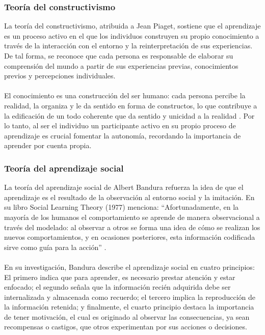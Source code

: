 \subsubsection{Teoría del constructivismo}
La teoría del constructivismo, atribuida a Jean Piaget, sostiene que el aprendizaje es un proceso activo en el que los individuos construyen su propio conocimiento a través de la interacción con el entorno y la reinterpretación de sus experiencias. De tal forma, se reconoce que cada persona es responsable de elaborar su comprensión del mundo a partir de sus experiencias previas, conocimientos previos y percepciones individuales.
\\
\\
El conocimiento es una construcción del ser humano: cada persona percibe la realidad, la organiza y le da sentido en forma de constructos, lo que contribuye a la edificación de un todo coherente que da sentido y unicidad a la realidad \cite{OrtizGranja2015}. Por lo tanto, al ser el individuo un participante activo en su propio proceso de aprendizaje es crucial fomentar la autonomía, recordando la importancia de aprender por cuenta propia.

\subsubsection{Teoría del aprendizaje social}
La teoría del aprendizaje social de Albert Bandura refuerza la idea de que el aprendizaje es el resultado de la observación al entorno social y la imitación. En su libro Social Learning Theory (1977) menciona: “Afortunadamente, en la mayoría de los humanos el comportamiento se aprende de manera observacional a través del modelado: al observar a otros se forma una idea de cómo se realizan los nuevos comportamientos, y en ocasiones posteriores, esta información codificada sirve como guía para la acción” \cite{Bandura1977}.
\\
\\
En su investigación, Bandura describe el aprendizaje social en cuatro principios: El primero indica que para aprender, es necesario prestar atención y estar enfocado; el segundo señala que la información recién adquirida debe ser internalizada y almacenada como recuerdo; el tercero implica la reproducción de la información retenida; y finalmente, el cuarto principio destaca la importancia de tener motivación, el cual es originado al observar las consecuencias, ya sean recompensas o castigos, que otros experimentan por sus acciones o decisiones.


